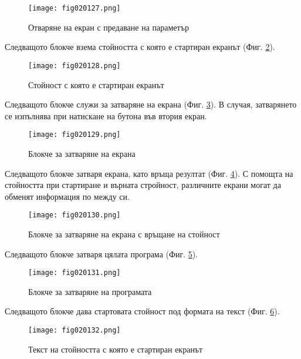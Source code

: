 \begin{figure}[H]
  \centering
  \texttt{[image: fig020127.png]}
  \caption{Отваряне на екран с предаване на параметър}
\label{fig020127}
\end{figure}

Следващото блокче взема стойността с която е стартиран екранът (Фиг. \ref{fig020128}).

\begin{figure}[H]
  \centering
  \texttt{[image: fig020128.png]}
  \caption{Стойност с която е стартиран екранът}
\label{fig020128}
\end{figure}

Следващото блокче служи за затваряне на екрана (Фиг. \ref{fig020129}). В случая, затварянето се изпълнява при натискане на бутона във втория екран. 

\begin{figure}[H]
  \centering
  \texttt{[image: fig020129.png]}
  \caption{Блокче за затваряне на екрана}
\label{fig020129}
\end{figure}

Следващото блокче затваря екрана, като връща резултат (Фиг. \ref{fig020130}). С помощта на стойността при стартиране и върната стройност, различните екрани могат да обменят информация по между си. 

\begin{figure}[H]
  \centering
  \texttt{[image: fig020130.png]}
  \caption{Блокче за затваряне на екрана с връщане на стойност}
\label{fig020130}
\end{figure}

Следващото блокче затваря цялата програма (Фиг. \ref{fig020131}).

\begin{figure}[H]
  \centering
  \texttt{[image: fig020131.png]}
  \caption{Блокче за затваряне на програмата}
\label{fig020131}
\end{figure}

Следващото блокче дава стартовата стойност под формата на текст (Фиг. \ref{fig020132}).

\begin{figure}[H]
  \centering
  \texttt{[image: fig020132.png]}
  \caption{Текст на стойността с която е стартиран екранът}
\label{fig020132}
\end{figure}

